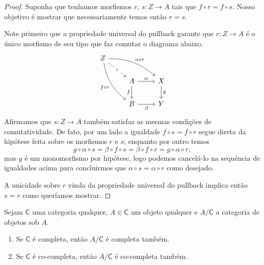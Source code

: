\begin{proof}
  Suponha que tenhamos morfismos $r,\,s: Z \to A$ tais que $f \circ r = f \circ s$.
  Nosso objetivo é mostrar que necessariamente temos então $r = s$.

  Note primeiro que a propriedade universal do pullback garante que $r: Z \to A$ é o único morfismo de seu tipo que faz comutar o diagrama abaixo.
  \begin{displaymath}
    \begin{tikzcd}
      Z
      \arrow[rd, dashed, "r" description]
      \arrow[rrd, bend left=20, "\alpha \circ r"]
      \arrow[rdd, bend right=20, "f \circ r" swap]
      \\ & A
      \arrow[r, "\alpha"]
      \arrow[d, "f" swap]
      & X
      \arrow[d, "g"]
      \\ & B
      \arrow[r, "\beta" swap]
      & Y
    \end{tikzcd}
  \end{displaymath}
  Afirmamos que $s: Z \to A$ também satisfaz as mesmas condições de comutatividade.
  De fato, por um lado a igualdade $f \circ s = f \circ r$ segue direta da hipótese feita sobre os morfismos $r$ e $s$; enquanto por outro temos
  \begin{displaymath}
    g \circ \alpha \circ s = \beta \circ f \circ s = \beta \circ f \circ r = g \circ \alpha \circ r,
  \end{displaymath}
  mas $g$ é um monomorfismo por hipótese, logo podemos cancelá-lo na sequência de igualdades acima para concluirmos que $\alpha \circ s = \alpha \circ r$ como desejado.

  A unicidade sobre $r$ vinda da propriedade universal do pullback implica então $s = r$ como queríamos mostrar.
\end{proof}

\begin{teo}
  Sejam $\mathsf{C}$ uma categoria qualquer, $A \in \mathsf{C}$ um objeto qualquer e $A / \mathsf{C}$ a categoria de objetos sob $A$.
  \begin{enumerate}
  \item Se $\mathsf{C}$ é completa, então $A / \mathsf{C}$ é completa também.
    
  \item Se $\mathsf{C}$ é co-completa, então $A / \mathsf{C}$ é co-completa também.
  \end{enumerate}
\end{teo}

